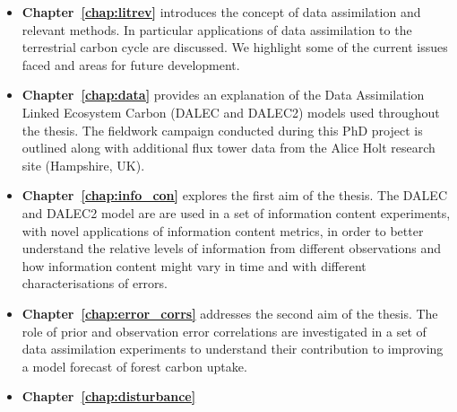 \begin{itemize}
\item \textbf{Chapter~\ref{chap:litrev}} introduces the concept of data assimilation and relevant methods. In particular applications of data assimilation to the terrestrial carbon cycle are discussed. We highlight some of the current issues faced and areas for future development.  

\item \textbf{Chapter~\ref{chap:data}} provides an explanation of the Data Assimilation Linked Ecosystem Carbon (DALEC and DALEC2) models used throughout the thesis. The fieldwork campaign conducted during this PhD project is outlined along with additional flux tower data from the Alice Holt research site (Hampshire, UK).

\item \textbf{Chapter~\ref{chap:info_con}} explores the first aim of the thesis. The DALEC and DALEC2 model are are used in a set of information content experiments, with novel applications of information content metrics, in order to better understand the relative levels of information from different observations and how information content might vary in time and with different characterisations of errors.

\item \textbf{Chapter~\ref{chap:error_corrs}} addresses the second aim of the thesis. The role of prior and observation error correlations are investigated in a set of data assimilation experiments to understand their contribution to improving a model forecast of forest carbon uptake.

\item \textbf{Chapter~\ref{chap:disturbance}} 
\end{itemize}
     

